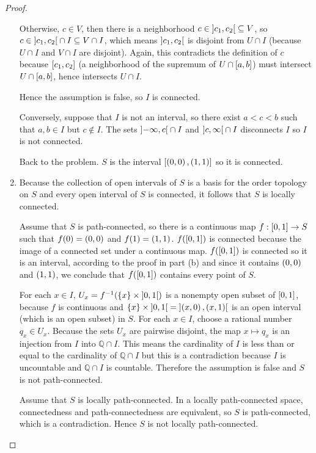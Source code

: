 \begin{proof}
\begin{enumerate}[label={(\alph*)}]
		      Otherwise, $c\in V$, then there is a neighborhood $c\in \left]{c_{1}, c_{2}}\right[ \subseteq V$, so $c\in \left]{c_{1}, c_{2}}\right[ \cap I \subseteq V\cap I$, which means $\left]{c_{1}, c_{2}}\right[$ is disjoint from $U\cap I$ (because $U\cap I$ and $V\cap I$ are disjoint). Again, this contradicts the definition of $c$ because $\left[{c_{1}, c_{2}}\right]$ (a neighborhood of the supremum of $U\cap \left[{a, b}\right]$) must intersect $U\cap \left[{a, b}\right]$, hence intersects $U\cap I$.

		      Hence the assumption is false, so $I$ is connected.

		      Conversely, suppose that $I$ is not an interval, so there exist $a < c < b$ such that $a, b\in I$ but $c\notin I$. The sets $\left]{-\infty, c}\right[\cap I$ and $\left]{c, \infty}\right[\cap I$ disconnects $I$ so $I$ is not connected.

		      Back to the problem. $S$ is the interval $\left[{\left({0,0}\right), \left({1,1}\right)}\right]$ so it is connected.
		\item Because the collection of open intervals of $S$ is a basis for the order topology on $S$ and every open interval of $S$ is connected, it follows that $S$ is locally connected.

		      Assume that $S$ is path-connected, so there is a continuous map $f: \left[{0, 1}\right] \to S$ such that $f(0) = \left({0,0}\right)$ and $f(1) = \left({1,1}\right)$. $f(\left[{0,1}\right])$ is connected because the image of a connected set under a continuous map. $f(\left[{0,1}\right])$ is connected so it is an interval, according to the proof in part (b) and since it contains $\left({0, 0}\right)$ and $\left({1, 1}\right)$, we conclude that $f(\left[{0, 1}\right])$ contains every point of $S$.

		      For each $x\in I$, $U_{x} = f^{-1}(\left\{{x}\right\} \times \left]{0,1}\right[)$ is a nonempty open subset of $\left[{0,1}\right]$, because $f$ is continuous and $\left\{{x}\right\} \times \left]{0, 1}\right[ = \left]{\left({x, 0}\right), \left({x, 1}\right)}\right[$ is an open interval (which is an open subset) in $S$. For each $x\in I$, choose a rational number $q_{x} \in U_{x}$. Because the sets $U_{x}$ are pairwise disjoint, the map $x\mapsto q_{x}$ is an injection from $I$ into $\mathbb{Q}\cap I$. This means the cardinality of $I$ is less than or equal to the cardinality of $\mathbb{Q}\cap I$ but this is a contradiction because $I$ is uncountable and $\mathbb{Q}\cap I$ is countable. Therefore the assumption is false and $S$ is not path-connected.

		      Assume that $S$ is locally path-connected. In a locally path-connected space, connectedness and path-connectedness are equivalent, so $S$ is path-connected, which is a contradiction. Hence $S$ is not locally path-connected.
	\end{enumerate}
\end{proof}

